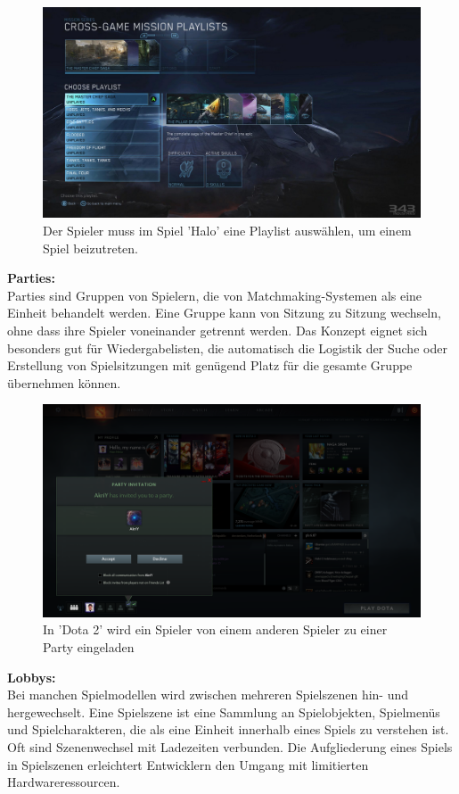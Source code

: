 \begin{figure}[H]
	\centering
	\includegraphics[width=120mm]{images/halo_playlist.png}
	\caption['Halo' Playlist]{Der Spieler muss im Spiel 'Halo' eine Playlist auswählen, um einem Spiel beizutreten.}
	\label{pic:halo_playlist}
\end{figure}

\textbf{Parties:} \\
Parties sind Gruppen von Spielern, die von Matchmaking-Systemen als eine Einheit behandelt werden. Eine Gruppe kann von Sitzung zu Sitzung wechseln, ohne dass ihre Spieler voneinander getrennt werden. Das Konzept eignet sich besonders gut für Wiedergabelisten, die automatisch die Logistik der Suche oder Erstellung von Spielsitzungen mit genügend Platz für die gesamte Gruppe übernehmen können. \cite{Wikipedia.2021b} 

\begin{figure}[H]
	\centering
	\includegraphics[width=120mm]{images/Dota2_Party_Invite.png}
	\caption['Dota 2' Party]{In 'Dota 2' wird ein Spieler von einem anderen Spieler zu einer Party eingeladen}
	\label{pic:Dota2_Party_Invite}
\end{figure}

\textbf{Lobbys:} \\
Bei manchen Spielmodellen wird zwischen mehreren Spielszenen hin- und hergewechselt. Eine Spielszene ist eine Sammlung an Spielobjekten, Spielmenüs und Spielcharakteren, die als eine Einheit innerhalb eines Spiels zu verstehen ist. Oft sind Szenenwechsel mit Ladezeiten verbunden. Die Aufgliederung eines Spiels in Spielszenen erleichtert Entwicklern den Umgang mit limitierten Hardwareressourcen. \cite{Wikipedia.2012}

